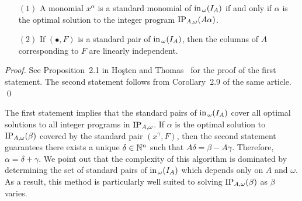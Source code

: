 \begin{proposition} 
\begin{enumerate}
\item[$(1)$] A monomial $x^{\alpha}$ is a standard monomial of
$\operatorname{in}_{\, \omega}(I_{A})$ if and only if $\alpha$ is the optimal
solution to the integer program $\operatorname{IP}_{A,\omega}(A\alpha)$.
\item[$(2)$] If $(\bullet, F)$ is a standard pair of
$\operatorname{in}_{\, \omega}(I_{A})$, then the columns of $A$ corresponding to
$F$ are linearly independent.
\end{enumerate}
\end{proposition} 

\begin{proof} 
See Proposition~2.1 in Ho\c{s}ten and Thomas~\cite{MR2000b:13037} for
the proof of the first statement. The second statement follows from
Corollary~2.9 of the same article.
\qed
\end{proof}

The first statement implies that the standard pairs of $\operatorname{in}_{\,
\omega}(I_{A})$ cover all optimal solutions to all integer programs
in $\operatorname{IP}_{A,\omega}$.  If $\alpha$ is the optimal solution to
$\operatorname{IP}_{A,\omega}(\beta)$ covered by the standard pair $(x^{\gamma},
F)$, then the second statement guarantees there exists a unique
$\delta \in {\mathbb N}^{n}$ such that $A \delta = \beta - A \gamma$.
Therefore, $\alpha = \delta + \gamma$.  We point out that the
complexity of this algorithm is dominated by determining the set of
standard pairs of $\operatorname{in}_{\, \omega}(I_{A})$ which depends only on
$A$ and $\omega$.  As a result, this method is particularly well
suited to solving $\operatorname{IP}_{A,\omega}(\beta)$ as $\beta$ varies.


